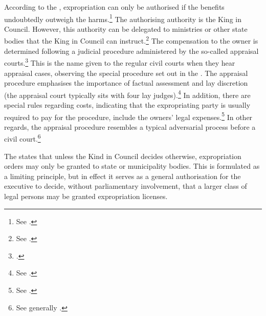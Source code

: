According to the \cite{ea59}, expropriation can only be authorised if the benefits undoubtedly outweigh the harms.\footnote{See \cite[2]{ea59}.} 
The authorising authority is the King in Council. However, this authority can be delegated to ministries or other state bodies that the King in Council can instruct.\footnote{See \cite[5]{ea59}.} The compensation to the owner is determined following a judicial procedure administered by the so-called appraisal courts.\footnote{\cite[2]{ea59}.} This is the name given to the regular civil courts when they hear appraisal cases, observing the special procedure set out in the \cite{aa17}. The appraisal procedure emphasises the importance of factual assessment and lay discretion (the appraisal court typically sits with four lay judges).\footnote{See \cite[11-12]{aa17}.} In addition, there are special rules regarding costs, indicating that the expropriating party is usually required to pay for the procedure, include the owners' legal expenses.\footnote{See \cite[54]{aa17}.} In other regards, the appraisal procedure resembles a typical adversarial process before a civil court.\footnote{See generally \cite{dyrkolbotn15}.} 

The \cite{ea59} states that unless the Kind in Council decides otherwise, expropriation orders may only be granted to state or municipality bodies. This is formulated as a limiting principle, but in effect it serves as a general authorisation for the executive to decide, without parliamentary involvement, that a larger class of legal persons may be granted expropriation licenses. 

